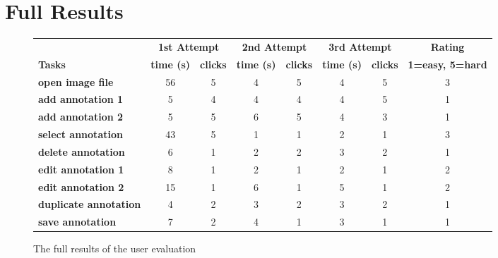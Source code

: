 \section{Full Results}
\label{Appendix}
\begin{figure}[ht]
	\begin{center}
		\begin{tabular}{ | l | c | c | c | c | c | c | c | }
			\hline
			& \multicolumn{2}{|c|}{\bf 1st Attempt} & \multicolumn{2}{|c|}{\bf 2nd Attempt} & \multicolumn{2}{|c|}{\bf 3rd Attempt} & \bf Rating \\
			\bf Tasks & \bf time (s) & \bf clicks & \bf time (s) & \bf clicks & \bf time (s) & \bf clicks & \bf 1=easy, 5=hard \\
			\hline \hline
			\bf open image file & 56 & 5 & 4 & 5 & 4 & 5 & 3 \\
			\bf add annotation 1 & 5 & 4 & 4 & 4 & 4 & 5 & 1 \\
			\bf add annotation 2 & 5 & 5 & 6 & 5 & 4 & 3 & 1 \\
			\bf select annotation & 43 & 5 & 1 & 1 & 2 & 1 & 3 \\
			\bf delete annotation & 6 & 1 & 2 & 2 & 3 & 2 & 1 \\
			\bf edit annotation 1 & 8 & 1 & 2 & 1 & 2 & 1 & 2 \\
			\bf edit annotation 2 & 15 & 1 & 6 & 1 & 5 & 1 & 2 \\
			\bf duplicate annotation & 4 & 2 & 3 & 2 & 3 & 2 & 1 \\
			\bf save annotation & 7 & 2 & 4 & 1 & 3 & 1 & 1 \\
			\hline
		\end{tabular}
		\caption{The full results of the user evaluation}
	\end{center}
\end{figure}
